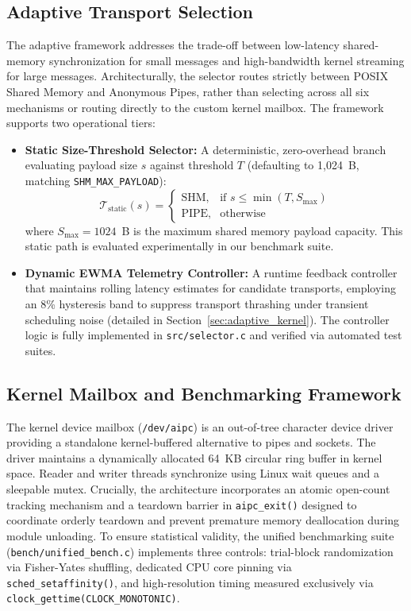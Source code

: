 \subsection{Adaptive Transport Selection}
The adaptive framework addresses the trade-off between low-latency shared-memory synchronization for small messages and high-bandwidth kernel streaming for large messages. Architecturally, the selector routes strictly between POSIX Shared Memory and Anonymous Pipes, rather than selecting across all six mechanisms or routing directly to the custom kernel mailbox. The framework supports two operational tiers:
\begin{itemize}[leftmargin=*,noitemsep,topsep=1.5pt]
    \item \textbf{Static Size-Threshold Selector:} A deterministic, zero-overhead branch evaluating payload size $s$ against threshold $T$ (defaulting to 1,024~B, matching \texttt{SHM\_MAX\_PAYLOAD}):
    \begin{equation}
    \mathcal{T}_{\text{static}}(s) = 
    \begin{cases} 
    \text{SHM}, & \text{if } s \le \min(T, S_{\max}) \\ 
    \text{PIPE}, & \text{otherwise} 
    \end{cases}
    \end{equation}
    where $S_{\max} = 1024$~B is the maximum shared memory payload capacity. This static path is evaluated experimentally in our benchmark suite.
    \item \textbf{Dynamic EWMA Telemetry Controller:} A runtime feedback controller that maintains rolling latency estimates for candidate transports, employing an 8\% hysteresis band to suppress transport thrashing under transient scheduling noise (detailed in Section~\ref{sec:adaptive_kernel}). The controller logic is fully implemented in \texttt{src/selector.c} and verified via automated test suites.
\end{itemize}

\subsection{Kernel Mailbox and Benchmarking Framework}
The kernel device mailbox (\texttt{/dev/aipc}) is an out-of-tree character device driver providing a standalone kernel-buffered alternative to pipes and sockets. The driver maintains a dynamically allocated 64~KB circular ring buffer in kernel space. Reader and writer threads synchronize using Linux wait queues and a sleepable mutex. Crucially, the architecture incorporates an atomic open-count tracking mechanism and a teardown barrier in \texttt{aipc\_exit()} designed to coordinate orderly teardown and prevent premature memory deallocation during module unloading.
To ensure statistical validity, the unified benchmarking suite (\texttt{bench/unified\_bench.c}) implements three controls: trial-block randomization via Fisher-Yates shuffling, dedicated CPU core pinning via \texttt{sched\_setaffinity()}, and high-resolution timing measured exclusively via \texttt{clock\_gettime(CLOCK\_MONOTONIC)}.